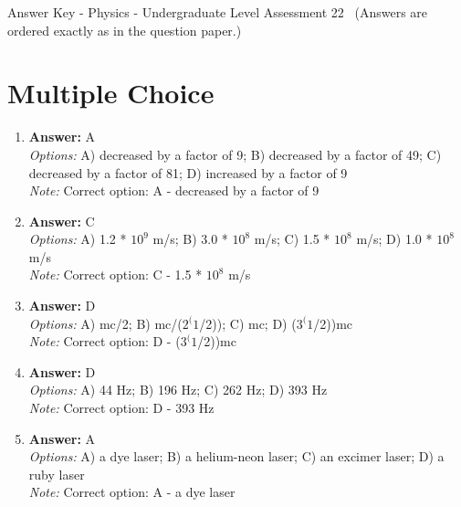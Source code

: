 \documentclass[12pt]{article}
\begin{document}
\begin{center}
Answer Key - Physics - Undergraduate Level Assessment 22 \
\small (Answers are ordered exactly as in the question paper.)
\end{center}

\section*{Multiple Choice}
\begin{enumerate}[label=\arabic*.]
\item \textbf{Answer:} A
\\ \textit{Options:} A) decreased by a factor of 9; B) decreased by a factor of 49; C) decreased by a factor of 81; D) increased by a factor of 9
\\ \textit{Note:} Correct option: A - decreased by a factor of 9
\item \textbf{Answer:} C
\\ \textit{Options:} A) 1.2 * $10^9$ m/s; B) 3.0 * $10^8$ m/s; C) 1.5 * $10^8$ m/s; D) 1.0 * $10^8$ m/s
\\ \textit{Note:} Correct option: C - 1.5 * $10^8$ m/s
\item \textbf{Answer:} D
\\ \textit{Options:} A) mc/2; B) mc/($2^(1$/2)); C) mc; D) ($3^(1$/2))mc
\\ \textit{Note:} Correct option: D - ($3^(1$/2))mc
\item \textbf{Answer:} D
\\ \textit{Options:} A) 44 Hz; B) 196 Hz; C) 262 Hz; D) 393 Hz
\\ \textit{Note:} Correct option: D - 393 Hz
\item \textbf{Answer:} A
\\ \textit{Options:} A) a dye laser; B) a helium-neon laser; C) an excimer laser; D) a ruby laser
\\ \textit{Note:} Correct option: A - a dye laser
\end{enumerate}
\end{document}
